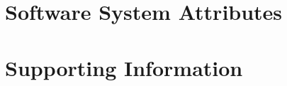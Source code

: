 \documentclass{scrreprt}
\begin{document}
\section{Software System Attributes}


\section{Supporting Information}
\end{document}
